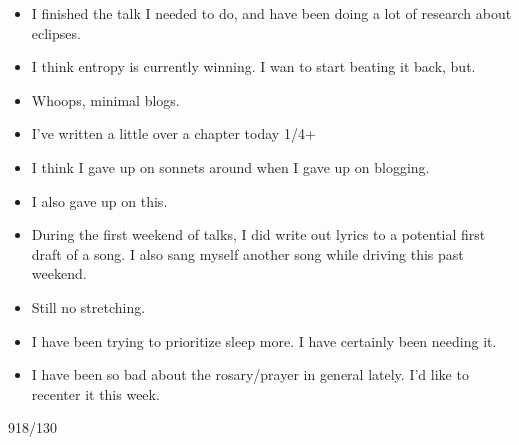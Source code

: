 \documentclass[12pt]{article}[titlepage]
\newcommand{\1}{\={a}}
\newcommand{\2}{\={e}}
\newcommand{\3}{\={\i}}
\newcommand{\4}{\=o}
\newcommand{\5}{\=u}
\newcommand{\6}{\={A}}
\renewcommand{\,}{\textsuperscript{,}}
\begin{document}
\begin{itemize}
\item I finished the talk I needed to do, and have been doing a lot of research about eclipses.
\item I think entropy is currently winning. I wan to start beating it back, but.
\item Whoops, minimal blogs.
\item I've written a little over a chapter today 1/4+
\item I think I gave up on sonnets around when I gave up on blogging.
\item I also gave up on this.
\item During the first weekend of talks, I did write out lyrics to a potential first draft of a song. I also sang myself another song while driving this past weekend.
\item Still no stretching.
\item I have been trying to prioritize sleep more. I have certainly been needing it.
\item I have been so bad about the rosary/prayer in general lately. I'd like to recenter it this week.
\end{itemize}
918/130
\end{document}
